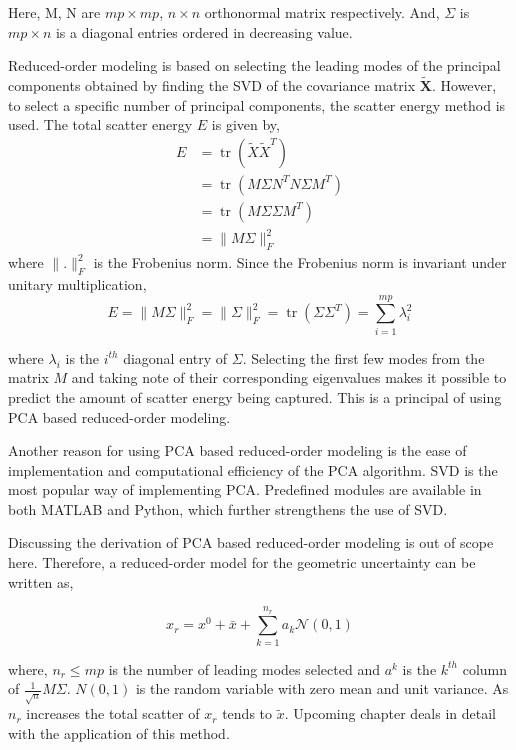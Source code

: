 Here, M, N are $mp \times mp$, $n \times n$ orthonormal matrix respectively. And, $\Sigma$ is $mp \times n$ is a diagonal entries ordered in decreasing value. 

Reduced-order modeling is based on selecting the leading modes of the principal components obtained by finding the SVD of the covariance matrix $\tilde{\textbf{X}}$. However, to select a specific number of principal components, the scatter energy method is used. The total scatter energy $E$ is given by,
\begin{equation}\begin{aligned}
E &=\operatorname{tr}\left(\tilde{X} \tilde{X}^{T}\right) \\
&=\operatorname{tr}\left(M \Sigma N^{T} N \Sigma M^{T}\right) \\
&=\operatorname{tr}\left(M \Sigma \Sigma M^{T}\right) \\
&=\|M \Sigma\|_{F}^{2}
\end{aligned}
\label{random_energy}
\end{equation}
where $\|.\|_{F}^{2}$ is the Frobenius norm. Since the Frobenius norm is invariant under unitary multiplication,
$$E=\|M \Sigma\|_{F}^{2}=\|\Sigma\|_{F}^{2}=\operatorname{tr}\left(\Sigma \Sigma^{T}\right)=\sum_{i=1}^{m p} \lambda_{i}^{2}$$

where $\lambda_i$ is the $i^{th}$ diagonal entry of $\Sigma$. Selecting the first few modes from the matrix $M$ and taking note of their corresponding eigenvalues makes it possible to predict the amount of scatter energy being captured. This is a principal of using PCA based reduced-order modeling.

Another reason for using PCA based reduced-order modeling is the ease of implementation and computational efficiency of the PCA algorithm. SVD is the most popular way of implementing PCA. Predefined modules are available in both MATLAB\textsuperscript{\textregistered} and Python, which further strengthens the use of SVD.

Discussing the derivation of PCA based reduced-order modeling is out of scope here. Therefore, a reduced-order model for the geometric uncertainty can be written as,

\begin{equation}
x_{r}=x^{0}+\bar{x}+\sum_{k=1}^{n_{r}} a_{k} \mathcal{N}(0,1)
\end{equation}

where, $n_r \leq mp$ is the number of leading modes selected and $a^k$ is the $k^{th}$ column of $\frac{1}{\sqrt{n}}M\Sigma$. $N(0,1)$ is the random variable with zero mean and unit variance. As $n_r$ increases the total scatter of $x_r$ tends to $\tilde{x}$. Upcoming chapter deals in detail with the application of this method.